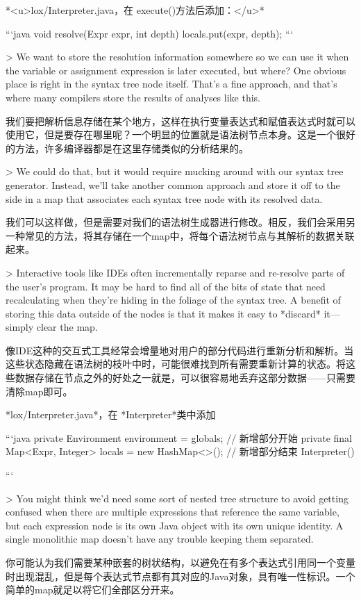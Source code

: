 \documentclass[cn,11pt,chinese]{elegantbook}
\begin{document}
{{{{{{{{{{{{{*<u>lox/Interpreter.java，在 execute()方法后添加：</u>*

```java
  void resolve(Expr expr, int depth) {
    locals.put(expr, depth);
  }
```

> We want to store the resolution information somewhere so we can use it when the variable or assignment expression is later executed, but where? One obvious place is right in the syntax tree node itself. That’s a fine approach, and that’s where many compilers store the results of analyses like this.

我们要把解析信息存储在某个地方，这样在执行变量表达式和赋值表达式时就可以使用它，但是要存在哪里呢？一个明显的位置就是语法树节点本身。这是一个很好的方法，许多编译器都是在这里存储类似的分析结果的。

> We could do that, but it would require mucking around with our syntax tree generator. Instead, we’ll take another common approach and store it off to the side in a map that associates each syntax tree node with its resolved data.

我们可以这样做，但是需要对我们的语法树生成器进行修改。相反，我们会采用另一种常见的方法，将其存储在一个map中，将每个语法树节点与其解析的数据关联起来。

> Interactive tools like IDEs often incrementally reparse and re-resolve parts of the user’s program. It may be hard to find all of the bits of state that need recalculating when they’re hiding in the foliage of the syntax tree. A benefit of storing this data outside of the nodes is that it makes it easy to *discard* it—simply clear the map.

像IDE这种的交互式工具经常会增量地对用户的部分代码进行重新分析和解析。当这些状态隐藏在语法树的枝叶中时，可能很难找到所有需要重新计算的状态。将这些数据存储在节点之外的好处之一就是，可以很容易地丢弃这部分数据——只需要清除map即可。

*lox/Interpreter.java*，在 *Interpreter*类中添加

```java
  private Environment environment = globals;
  // 新增部分开始
  private final Map<Expr, Integer> locals = new HashMap<>();
  // 新增部分结束
  Interpreter() {
```

> You might think we’d need some sort of nested tree structure to avoid getting confused when there are multiple expressions that reference the same variable, but each expression node is its own Java object with its own unique identity. A single monolithic map doesn’t have any trouble keeping them separated.

你可能认为我们需要某种嵌套的树状结构，以避免在有多个表达式引用同一个变量时出现混乱，但是每个表达式节点都有其对应的Java对象，具有唯一性标识。一个简单的map就足以将它们全部区分开来。

}}}}}}}}}}}}}}
\end{document}
